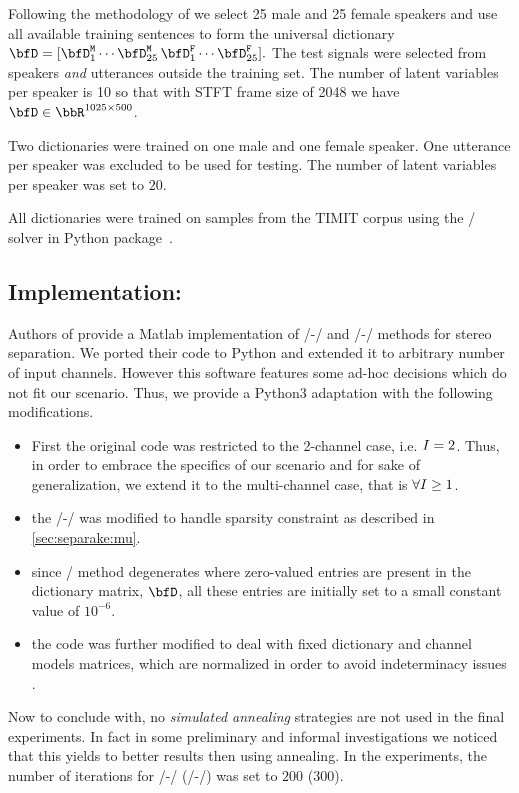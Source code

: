  Following the methodology of  we select 25 male and 25 female speakers
and use all available training sentences to form the universal dictionary
$
    \mD = [\mD_1^\mathtt{M}\cdots \mD_{25}^\mathtt{M}\,\mD_{1}^\mathtt{F}\cdots\mD_{25}^\mathtt{F}].
$
The test signals were selected from speakers \emph{and} utterances outside the training set.
The number of latent variables per speaker is 10 so that with STFT frame size of 2048 we have $\mD\in\R^{1025\times500}$.

Two dictionaries were trained on one male and one female speaker.
One utterance per speaker was excluded to be used for testing.
The number of latent variables per speaker was set to $20$.

\mynewline
All dictionaries were trained on samples from the TIMIT corpus  using the \NMF/ solver in  Python package~.

\subsection{Implementation:}
Authors of  provide a Matlab implementation of \MU/-\NMF/ and \EM/-\NMF/ methods for stereo separation.
We ported their code to Python and extended it to arbitrary number of input channels.
However this software features some ad-hoc decisions which do not fit our scenario.
Thus, we provide a Python3 adaptation with the following modifications.
\begin{itemize}
    \item First the original code was restricted to the 2-channel case, i.e.  $I = 2$.
    Thus, in order to embrace the specifics of our scenario and for sake of generalization, we extend it to the multi-channel case, that is $\forall I \geq 1$.
    \item the \MU/-\NMF/ was modified to handle sparsity constraint as described in \ref{sec:separake:mu}.
    \item since \EM/ method degenerates where zero-valued entries are present in the dictionary matrix, $\mD$, all these entries are initially set to a small constant value of $10^{-6}$.
    \item the code was further modified to deal with fixed dictionary and channel models matrices, which are normalized in order to avoid indeterminacy issues .
\end{itemize}
Now to conclude with, no \textit{simulated annealing} strategies are not used in the final experiments.
In fact in some preliminary and informal investigations we noticed that this yields to better results then using annealing.
In the experiments, the number of iterations for \MU/-\NMF/ (\EM/-\NMF/) was set to $200$ ($300$).

